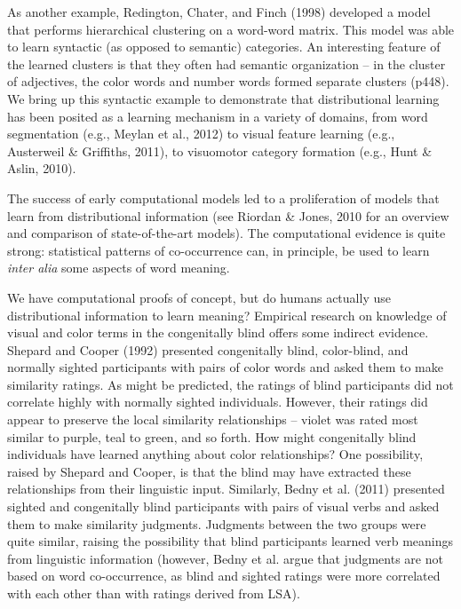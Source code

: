 \documentclass[man,floatsintext]{apa6}
\begin{document}
As another example, Redington, Chater, and Finch (1998) developed a model that performs hierarchical clustering on a word-word matrix. This model was able to learn syntactic (as opposed to semantic) categories. An interesting feature of the learned clusters is that they often had semantic organization -- in the cluster of adjectives, the color words and number words formed separate clusters (p448). We bring up this syntactic example to demonstrate that distributional learning has been posited as a learning mechanism in a variety of domains, from word segmentation (e.g., Meylan et al., 2012) to visual feature learning (e.g., Austerweil \& Griffiths, 2011), to visuomotor category formation (e.g., Hunt \& Aslin, 2010).

The success of early computational models led to a proliferation of models that learn from distributional information (see Riordan \& Jones, 2010 for an overview and comparison of state-of-the-art models). The computational evidence is quite strong: statistical patterns of co-occurrence can, in principle, be used to learn \emph{inter alia} some aspects of word meaning.

We have computational proofs of concept, but do humans actually use distributional information to learn meaning? Empirical research on knowledge of visual and color terms in the congenitally blind offers some indirect evidence. Shepard and Cooper (1992) presented congenitally blind, color-blind, and normally sighted participants with pairs of color words and asked them to make similarity ratings. As might be predicted, the ratings of blind participants did not correlate highly with normally sighted individuals. However, their ratings did appear to preserve the local similarity relationships -- violet was rated most similar to purple, teal to green, and so forth. How might congenitally blind individuals have learned anything about color relationships? One possibility, raised by Shepard and Cooper, is that the blind may have extracted these relationships from their linguistic input. Similarly, Bedny et al. (2011) presented sighted and congenitally blind participants with pairs of visual verbs and asked them to make similarity judgments. Judgments between the two groups were quite similar, raising the possibility that blind participants learned verb meanings from linguistic information (however, Bedny et al. argue that judgments are not based on word co-occurrence, as blind and sighted ratings were more correlated with each other than with ratings derived from LSA).
\end{document}

